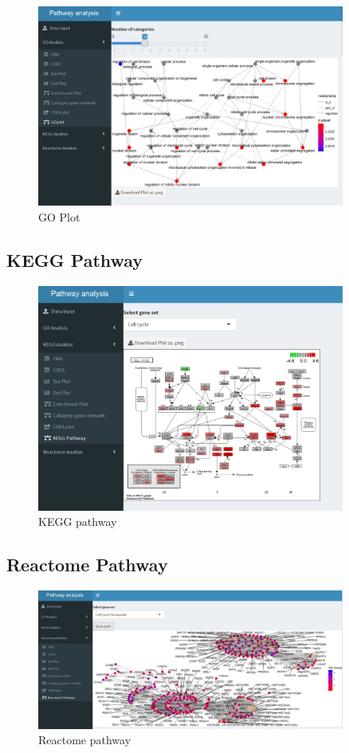 \documentclass[]{article}
\begin{document}
\begin{figure}[H]
\centering
\includegraphics[width=0.9\textwidth]{App_F19_Items_GO_GOPlot.png}  
\caption{GO Plot}
\end{figure}

\subsection{KEGG Pathway}

\begin{figure}[H]
\centering
\includegraphics[width=0.9\textwidth]{App_F20_Items_KEGG_KEGGPathway.png}  
\caption{KEGG pathway}
\end{figure}

\subsection{Reactome Pathway}

\begin{figure}[H]
\centering
\includegraphics[width=0.9\textwidth]{App_F21_Items_RA_RAPathway.png}  
\caption{Reactome pathway}
\end{figure}
\end{document}
